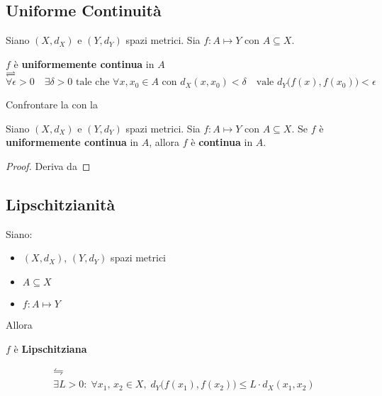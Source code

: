 \subsection{Uniforme Continuità}
\begin{definition}
	\label{def:unif_cont}
	Siano $(X,d_X)$ e $(Y,d_Y)$ spazi metrici. Sia $f:A \mapsto Y$ con $A \subseteq X$.
	\begin{center}
		$f$ è \textbf{uniformemente continua} in $A$\\
		$\rightleftharpoons$\\
		$\forall \epsilon > 0 \quad \exists \delta > 0 \text{ tale che } \forall x,x_0 \in A \text{ con } d_X(x,x_0) < \delta \quad \text{vale } d_Y\bigl(f(x),f(x_0)\bigr) < \epsilon$
	\end{center}
\end{definition}
\begin{exercise}
	\label{ex:cont_unif_cont_comparision}
	Confrontare la  con la 
\end{exercise}
\begin{proposition}
	\label{prop:if_unif_cont_then_conf}
	Siano $(X,d_X)$ e $(Y,d_Y)$ spazi metrici. Sia $f:A \mapsto Y$ con $A \subseteq X$. Se $f$ è \textbf{uniformemente continua} in $A$, allora $f$ è \textbf{continua} in $A$.
	\begin{proof}
		Deriva da 
	\end{proof}
\end{proposition}
\subsection{Lipschitzianità}
\begin{definition}
	\label{def:lips}
	Siano:
	\begin{itemize}
		\item $(X,d_X)$, $(Y,d_Y)$ spazi metrici
		\item $A \subseteq X$
		\item $f:A \mapsto Y$
	\end{itemize}
	Allora
	\begin{center}
		$f$ è \textbf{Lipschitziana}
	\end{center}
	\begin{equation*}\label{eq1}
		\begin{gathered}
			\leftrightharpoons \\
			\exists L > 0:\; \forall x_1,\,x_2 \in X,\;d_Y\bigl(f(x_1),f(x_2)\bigr)\leq L \cdot d_X(x_1,x_2)
		\end{gathered}
	\end{equation*}
\end{definition}

